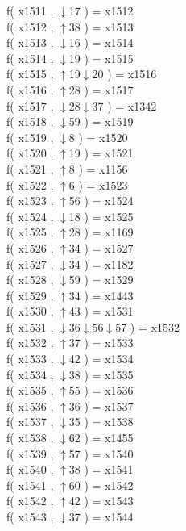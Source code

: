 f( x1511 , $\downarrow$17 ) = x1512 \\
f( x1512 , $\uparrow$38 ) = x1513 \\
f( x1513 , $\downarrow$16 ) = x1514 \\
f( x1514 , $\downarrow$19 ) = x1515 \\
f( x1515 , $\uparrow$19$\downarrow$20 ) = x1516 \\
f( x1516 , $\uparrow$28 ) = x1517 \\
f( x1517 , $\downarrow$28$\downarrow$37 ) = x1342 \\
f( x1518 , $\downarrow$59 ) = x1519 \\
f( x1519 , $\downarrow$8 ) = x1520 \\
f( x1520 , $\uparrow$19 ) = x1521 \\
f( x1521 , $\uparrow$8 ) = x1156 \\
f( x1522 , $\uparrow$6 ) = x1523 \\
f( x1523 , $\uparrow$56 ) = x1524 \\
f( x1524 , $\downarrow$18 ) = x1525 \\
f( x1525 , $\uparrow$28 ) = x1169 \\
f( x1526 , $\uparrow$34 ) = x1527 \\
f( x1527 , $\downarrow$34 ) = x1182 \\
f( x1528 , $\downarrow$59 ) = x1529 \\
f( x1529 , $\uparrow$34 ) = x1443 \\
f( x1530 , $\uparrow$43 ) = x1531 \\
f( x1531 , $\downarrow$36$\downarrow$56$\downarrow$57 ) = x1532 \\
f( x1532 , $\uparrow$37 ) = x1533 \\
f( x1533 , $\downarrow$42 ) = x1534 \\
f( x1534 , $\downarrow$38 ) = x1535 \\
f( x1535 , $\uparrow$55 ) = x1536 \\
f( x1536 , $\uparrow$36 ) = x1537 \\
f( x1537 , $\downarrow$35 ) = x1538 \\
f( x1538 , $\downarrow$62 ) = x1455 \\
f( x1539 , $\uparrow$57 ) = x1540 \\
f( x1540 , $\uparrow$38 ) = x1541 \\
f( x1541 , $\uparrow$60 ) = x1542 \\
f( x1542 , $\uparrow$42 ) = x1543 \\
f( x1543 , $\downarrow$37 ) = x1544 \\
